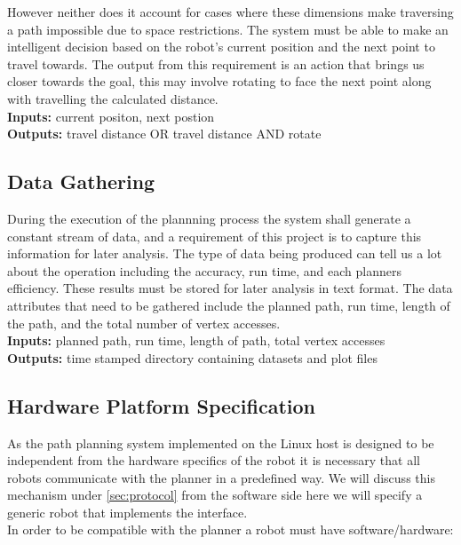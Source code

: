 \noindent
However neither does it account for cases where these dimensions make traversing a path impossible due to space restrictions. The system must be able to make an intelligent decision based on the robot's current position and the next point to travel towards. The output from this requirement is an action that brings us closer towards the goal, this may involve rotating to face the next point along with travelling the calculated distance. \\

\noindent
\textbf{Inputs:} current positon, next postion \\
\textbf{Outputs:} travel distance OR travel distance AND rotate

\subsection{Data Gathering}
\noindent
During the execution of the plannning process the system shall generate a constant stream of data, and a requirement
of this project is to capture this information for later analysis. The type of data being produced can tell us a lot
about the operation including the accuracy, run time, and each planners efficiency. These results must be stored for later analysis in text format. The data attributes that need to be gathered include the planned path, run time, length of the path, and the total number of vertex accesses. \\

\noindent
\textbf{Inputs:} planned path, run time, length of path, total vertex accesses \\
\textbf{Outputs:} time stamped directory containing datasets and plot files

\subsection{Hardware Platform Specification}\label{hardware_specification}
\noindent
As the path planning system implemented on the Linux host is designed to be independent from the hardware specifics of the robot it is necessary that all robots communicate with the planner in a predefined way. We will discuss this mechanism under \ref{sec:protocol} from the software side here we will specify a generic robot that implements the interface. \\

\noindent
In order to be compatible with the planner a robot must have software/hardware:

